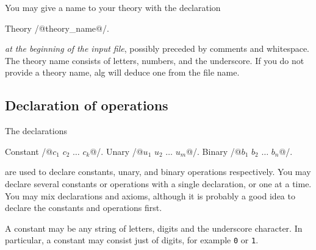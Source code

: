 \documentclass{article}
\begin{document}
You may give a name to your theory with the declaration
%
\begin{alg}
Theory /@theory_name@/.
\end{alg}
%
\emph{at the beginning of the input file}, possibly preceded by
comments and whitespace. The theory name consists of letters, numbers,
and the underscore. If you do not provide a theory name, alg will
deduce one from the file name.

\subsection{Declaration of operations}

The declarations
%
\begin{alg}
Constant /@$c_1$ $c_2$ $\ldots$ $c_k$@/.
Unary /@$u_1$ $u_2$ $\ldots$ $u_m$@/.
Binary /@$b_1$ $b_2$ $\ldots$ $b_n$@/.
\end{alg}
%
are used to declare constants, unary, and binary operations
respectively. You may declare several constants or operations with a
single declaration, or one at a time. You may mix declarations and
axioms, although it is probably a good idea to declare the constants
and operations first.

A constant may be any string of letters, digits and the underscore
character. In particular, a constant may consist just of digits, for
example \texttt{0} or \texttt{1}.
\end{document}
